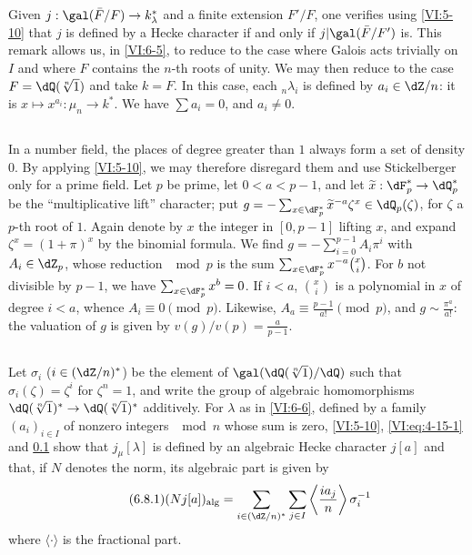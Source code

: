 Given $j:\gal(\bar F/F) \to k_\lambda^\ast$ and a finite extension 
$F'/F$, one verifies using \ref{VI:5-10} that $j$ is defined by a 
Hecke character if and only if $j|\gal(\bar F/F')$ is. This 
remark allows us, in \ref{VI:6-5}, to reduce to the case where Galois acts 
trivially on $I$ and where $F$ contains the $n$-th roots of 
unity. We may then reduce to the case $F=\dQ(\sqrt[n]{1})$ and 
take $k=F$. In this case, each $_n \lambda_i$ is defined by 
$a_i\in \dZ/n$: it is $x\mapsto x^{a_i}:\mu_n \to k^\ast$. We have 
$\sum a_i=0$, and $a_i\ne 0$. 





\subsection{}\label{VI:6-7}

In a number field, the places of degree greater than $1$ always form a 
set of density $0$. By applying \ref{VI:5-10}, we may therefore disregard 
them and use Stickelberger only for a prime field. Let 
$p$ be prime, let $0<a<p-1$, and let $\widetilde x:\dF_p^\ast \to \dQ_p^\ast$ be the 
``multiplicative lift'' character; put 
  $g=-\sum_{x\in \dF_p^\ast} \widetilde x^{-a} \zeta^x\in \dQ_p(\zeta)$, for 
$\zeta$ a $p$-th root of $1$. Again denote by $x$ the integer in $[0,p-1]$ 
  lifting $x$, and expand $\zeta^x=(1+\pi)^x$ by the binomial formula. 
  We find $g=-\sum_{i=0}^{p-1} A_i\pi^i$ with $A_i\in \dZ_p$, whose reduction 
$\mod p$ is the sum $\sum_{x\in \dF_p^\ast} x^{-a} \binom x i$. For $b$ not 
divisible by $p-1$, we have $\sum_{x\in \dF_p^\ast} x^b=0$. If $i<a$, 
$\binom x i$ is a polynomial in $x$ of degree $i<a$, whence 
$A_i\equiv 0\pmod p$. Likewise, $A_a\equiv \frac{p-1}{a!} \pmod p$, and 
$g\sim \frac{\pi^a}{a!}$: the valuation of $g$ is given by 
$v(g)/v(p) = \frac{a}{p-1}$. 





\subsection{}\label{VI:6-8}

Let $\sigma_i$ ($i\in (\dZ/n)^\ast$) be the element of 
$\gal(\dQ(\sqrt[n]{1})/\dQ)$ such that $\sigma_i(\zeta)=\zeta^i$ for $\zeta^n=1$, 
and write the group of algebraic homomorphisms 
$\dQ(\sqrt[n]{1})^\ast \to \dQ(\sqrt[n]{1})^\ast$ additively. For $\lambda$ as in 
\ref{VI:6-6}, defined by a family 
$(a_i)_{i\in I}$ of nonzero integers $\mod n$ whose sum is zero, 
\ref{VI:5-10}, \eqref{VI:eq:4-15-1} and \ref{VI:6-7} 
show that $j_\mu[\lambda]$ is defined by an algebraic Hecke character 
$j[a]$ and that, if $N$ denotes the norm, its algebraic part is 
given by 
\begin{equation*}\tag{6.8.1}\label{VI:eq:6-8-1}
  (N j[a])_\text{alg} = \sum_{i\in (\dZ/n)^\ast} \sum_{j\in I} \left\langle \frac{i a_j}{n} \right\rangle \sigma_i^{-1} 
\end{equation*}
  where $\langle \cdot \rangle$ is the fractional part. 





